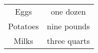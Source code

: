 \begin{center}
\begin{tabular}{|c|c|}
\hline
Eggs & one dozen \\
Potatoes & nine pounds \\
Milks & three quarts \\
\hline
\end{tabular}
\end{center}
